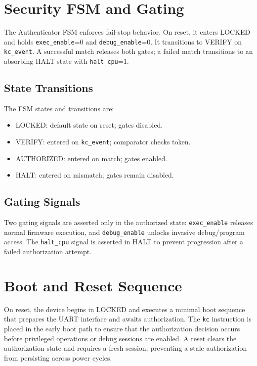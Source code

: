 \section{Security FSM and Gating}
The Authenticator FSM enforces fail-stop behavior. On reset, it enters \textsf{LOCKED}
and holds \texttt{exec\_enable}=0 and \texttt{debug\_enable}=0. It transitions to
\textsf{VERIFY} on \texttt{kc\_event}. A successful match releases both gates; a failed
match transitions to an absorbing \textsf{HALT} state with \texttt{halt\_cpu}=1.

\subsection{State Transitions}
The FSM states and transitions are:
\begin{itemize}
  \item \textsf{LOCKED}: default state on reset; gates disabled.
  \item \textsf{VERIFY}: entered on \texttt{kc\_event}; comparator checks token.
  \item \textsf{AUTHORIZED}: entered on match; gates enabled.
  \item \textsf{HALT}: entered on mismatch; gates remain disabled.
\end{itemize}

\subsection{Gating Signals}
Two gating signals are asserted only in the authorized state: \texttt{exec\_enable} releases
normal firmware execution, and \texttt{debug\_enable} unlocks invasive debug/program access.
The \texttt{halt\_cpu} signal is asserted in \textsf{HALT} to prevent progression after a
failed authorization attempt.

\section{Boot and Reset Sequence}
On reset, the device begins in \textsf{LOCKED} and executes a minimal boot sequence that
prepares the UART interface and awaits authorization. The \texttt{kc} instruction is placed
in the early boot path to ensure that the authorization decision occurs before privileged
operations or debug sessions are enabled. A reset clears the authorization state and
requires a fresh session, preventing a stale authorization from persisting across power
cycles.

